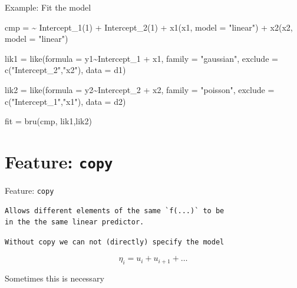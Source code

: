 \documentclass[
  ignorenonframetext,
]{beamer}
\newenvironment{Shaded}{\begin{snugshade}}{\end{snugshade}}
\newcommand{\AttributeTok}[1]{\textcolor[rgb]{0.77,0.63,0.00}{#1}}
\newcommand{\DecValTok}[1]{\textcolor[rgb]{0.00,0.00,0.81}{#1}}
\newcommand{\ErrorTok}[1]{\textcolor[rgb]{0.64,0.00,0.00}{\textbf{#1}}}
\newcommand{\FunctionTok}[1]{\textcolor[rgb]{0.00,0.00,0.00}{#1}}
\newcommand{\NormalTok}[1]{#1}
\newcommand{\OtherTok}[1]{\textcolor[rgb]{0.56,0.35,0.01}{#1}}
\newcommand{\SpecialCharTok}[1]{\textcolor[rgb]{0.00,0.00,0.00}{#1}}
\newcommand{\StringTok}[1]{\textcolor[rgb]{0.31,0.60,0.02}{#1}}
\begin{document}
\begin{frame}[fragile]{Example: Fit the model}
\protect\hypertarget{example-fit-the-model-1}{}
\begin{Shaded}
\begin{Highlighting}[]
\NormalTok{cmp }\OtherTok{=} \ErrorTok{\textasciitilde{}} \FunctionTok{Intercept\_1}\NormalTok{(}\DecValTok{1}\NormalTok{) }\SpecialCharTok{+} \FunctionTok{Intercept\_2}\NormalTok{(}\DecValTok{1}\NormalTok{) }\SpecialCharTok{+}
  \FunctionTok{x1}\NormalTok{(x1, }\AttributeTok{model =} \StringTok{"linear"}\NormalTok{) }\SpecialCharTok{+} \FunctionTok{x2}\NormalTok{(x2, }\AttributeTok{model =} \StringTok{"linear"}\NormalTok{)}

\NormalTok{lik1 }\OtherTok{=} \FunctionTok{like}\NormalTok{(}\AttributeTok{formula =}\NormalTok{ y1}\SpecialCharTok{\textasciitilde{}}\NormalTok{Intercept\_1 }\SpecialCharTok{+}\NormalTok{ x1,}
            \AttributeTok{family =} \StringTok{"gaussian"}\NormalTok{,}
            \AttributeTok{exclude =} \FunctionTok{c}\NormalTok{(}\StringTok{"Intercept\_2"}\NormalTok{,}\StringTok{"x2"}\NormalTok{),}
            \AttributeTok{data =}\NormalTok{ d1)}

\NormalTok{lik2 }\OtherTok{=} \FunctionTok{like}\NormalTok{(}\AttributeTok{formula =}\NormalTok{ y2}\SpecialCharTok{\textasciitilde{}}\NormalTok{Intercept\_2 }\SpecialCharTok{+}\NormalTok{ x2,}
            \AttributeTok{family =} \StringTok{"poisson"}\NormalTok{,}
            \AttributeTok{exclude =} \FunctionTok{c}\NormalTok{(}\StringTok{"Intercept\_1"}\NormalTok{,}\StringTok{"x1"}\NormalTok{),}
            \AttributeTok{data =}\NormalTok{ d2)}

\NormalTok{fit }\OtherTok{=} \FunctionTok{bru}\NormalTok{(cmp, lik1,lik2)}
\end{Highlighting}
\end{Shaded}
\end{frame}

\hypertarget{feature-copy}{%
\section{\texorpdfstring{Feature:
\texttt{copy}}{Feature: copy}}\label{feature-copy}}

\begin{frame}[fragile]{Feature: \texttt{copy}}
\protect\hypertarget{feature-copy-1}{}
\begin{verbatim}
Allows different elements of the same `f(...)` to be
in the the same linear predictor.
\end{verbatim}

\hfill\break

\begin{verbatim}
Without copy we can not (directly) specify the model
\end{verbatim}

\[
        \eta_i = u_i + u_{i+1} + \dots
\]

\hfill\break
Sometimes this is necessary
\end{frame}
\end{document}
